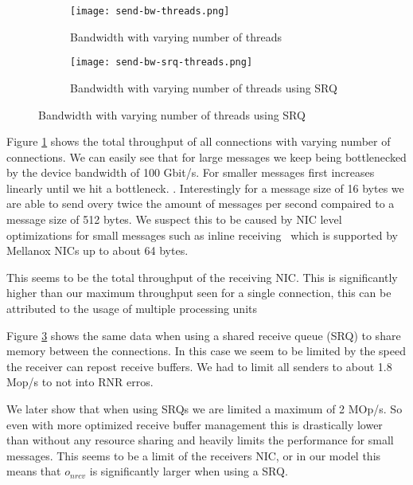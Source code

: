 \begin{figure}[]
\begin{subfigure}[b]{0.49\textwidth}
  \centering
  \texttt{[image: send-bw-threads.png]}
  \caption{Bandwidth with varying number of threads}
  \label{fig:plot-sndrcv-bw-thread}
\end{subfigure}
\begin{subfigure}[b]{0.49\textwidth}
  \centering
  \texttt{[image: send-bw-srq-threads.png]}
  \caption{Bandwidth with varying number of threads using SRQ}
  \label{fig:plot-sndrcv-bw-thread-srq}
\end{subfigure}
\end{figure}


Figure \ref{fig:plot-sndrcv-bw-thread} shows the total throughput of all connections with varying number of connections.
We can easily see that for large messages we keep being bottlenecked by the device bandwidth of 100 Gbit/s. For smaller
messages first increases linearly until we hit a bottleneck. . Interestingly
for a message size of 16 bytes we are able to send overy twice the amount of messages per second compaired to a message size
of 512 bytes. We suspect this to be caused by  NIC level optimizations for small messages 
such as inline receiving~\cite{anuj-guide} which is supported by Mellanox NICs up to about 64 bytes.

This seems to be the total throughput of the receiving NIC. This is significantly higher than our maximum throughput 
seen for a single connection, this can be attributed to the usage of multiple processing units~\cite{anuj-guide}


Figure \ref{fig:plot-sndrcv-bw-thread-srq} shows the same data when using a shared receive queue (SRQ) to share memory
between the connections. In this case we seem to be limited by the speed the receiver can repost receive buffers. We
had to limit all senders to about 1.8 Mop/s to not into RNR erros.

We later show that when using SRQs we are limited a maximum of 2 MOp/s. So even with more optimized receive buffer management
this is drastically lower than without any resource  sharing and heavily limits the performance for small messages. This seems
to be a limit of the receivers NIC, or in our model this means that $o_{nrcv}$ is significantly larger when using a 
SRQ. 


